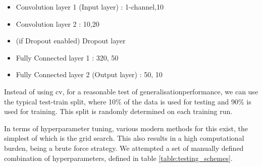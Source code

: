\begin{itemize}
    \itemsep-1em 
    \item Convolution layer 1 (Input layer) : 1-channel,10
    \item Convolution layer 2 : 10,20
    \item (if Dropout enabled) Dropout layer 
    \item Fully Connected layer 1 : 320, 50
    \item Fully Connected layer 2 (Output layer) : 50, 10
\end{itemize}



\bigskip



Instead of using \gls{cv}, for a reasonable test of \gls{generalisationperformance}, we can use the typical test-train split, where 10\% of the data is used for testing and 90\% is used for training. This split is randomly determined on each training run.
\bigskip

In terms of \gls{hyperparameter} tuning, various modern methods for this exist, the simplest of which is the grid search. This also results in a high computational burden, being a brute force strategy. We attempted a set of manually defined combination of \gls{hyperparameter}s, defined in table \ref{table:testing_schemes}.
\bigskip

